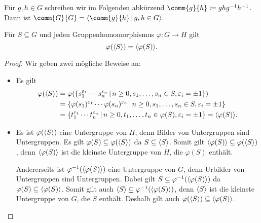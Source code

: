 \section{}

Für $g, h \in G$ schreiben wir im Folgenden abkürzend $\comm{g}{h} \coloneqq ghg^{-1}h^{-1}$.
Dann ist $\comm{G}{G} = \generated{ \comm{g}{h} \suchthat g, h \in G }$.

\begin{lemma}
  Für $S \subseteq G$ und jeden Gruppenhomomorphismus $\varphi \colon G \to H$ gilt
  \[
      \varphi( \langle S\rangle )
    = \langle \varphi(S) \rangle.
  \]
\end{lemma}

\begin{proof}
  Wir geben zwei mögliche Beweise an:
  \begin{itemize}
    \item
      Es gilt
      \begin{align*}
            \varphi( \generated{S} )
        &=  \varphi(\{
                      s_1^{\varepsilon_1} \dotsm s_n^{\varepsilon_n}
                    \suchthat 
                      n \geq 0,
                      s_1, \dotsc, s_n \in S,
                      \varepsilon_i = \pm 1
                    \})
        \\
        &=  \{
              \varphi(s_1)^{\varepsilon_1} \dotsm \varphi(s_n)^{\varepsilon_n}
            \suchthat 
              n \geq 0,
              s_1, \dotsc, s_n \in S,
              \varepsilon_i = \pm 1
            \}
        \\
        &=  \{
              t_1^{\varepsilon_1} \dotsm t_n^{\varepsilon_n}
            \suchthat 
              n \geq 0,
              t_1, \dotsc, t_n \in \varphi(S),
              \varepsilon_i = \pm 1
            \}
        =  \generated{ \varphi(S) }.
      \end{align*}
      
    \item
      Es ist $\varphi(\langle S\rangle)$ eine Untergruppe von $H$, denn Bilder von Untergruppen sind Untergruppen.
      Es gilt $\varphi(S) \subseteq \varphi(\langle S\rangle)$ da $S \subseteq \langle S\rangle$.
      Somit gilt $\langle\varphi(S)\rangle \subseteq \varphi(\langle S\rangle)$, denn $\langle\varphi(S)\rangle$ ist die kleinste Untergruppe von $H$, die $\varphi(S)$ enthält.
      
      Andererseits ist $\varphi^{-1}( \langle\varphi(S)\rangle )$ eine Untergruppe von $G$, denn Urbilder von Untergruppen sind Untergruppen.
      Dabei gilt $S \subseteq \varphi^{-1}( \langle\varphi(S)\rangle )$ da $\varphi(S) \subseteq \langle\varphi(S)\rangle$.
      Somit gilt auch $\langle S\rangle \subseteq \varphi^{-1}( \langle\varphi(S)\rangle )$, denn $\langle S\rangle$ ist die kleinste Untergruppe von $G$, die $S$ enthält.
      Deshalb gilt auch $\varphi(\langle S\rangle) \subseteq \langle\varphi(S)\rangle$.
    \qedhere
  \end{itemize}
\end{proof}





